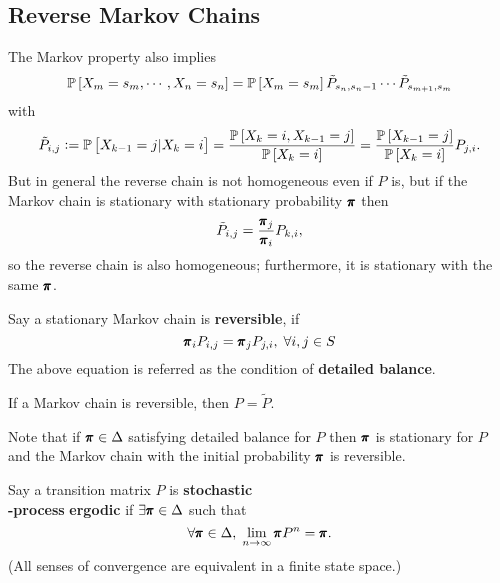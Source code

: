 \subsection{Reverse Markov Chains}

The Markov property also implies 
\begin{equation*}
    \mathbb{P} \left[ X_m = s_m, \cdots, X_n = s_n \right] = \mathbb{P} \left[ X_m = s_m \right] \tilde{P}_{s_n, s_n-1} \cdots \tilde{P}_{s_{m+1}, s_m}
\end{equation*}
with 
\begin{equation*}
    \tilde{P}_{i,j} := \mathbb{P} \left[ X_{k-1} = j| X_{k} = i \right] = \frac{\mathbb{P} \left[ X_k = i, X_{k-1} = j \right] }{\mathbb{P} \left[ X_{k} = i \right] } = \frac{\mathbb{P} \left[ X_{k-1} = j \right]}{\mathbb{P} \left[ X_k = i \right]} P_{j, i}.
\end{equation*}
But in general the reverse chain is not homogeneous even if $P$ is, but if the Markov chain is stationary with stationary probability $\pmb{\pi}$ then 
\begin{equation*}
    \tilde{P}_{i,j} = \frac{\pmb{\pi}_j}{\pmb{\pi}_i} P_{k,i},
\end{equation*} 
so the reverse chain is also homogeneous; furthermore, it is stationary with the same $\pmb{\pi}$.

\begin{definition}
    Say a stationary Markov chain is \textbf{reversible}, if
    \begin{equation*}
        \pmb{\pi}_i P_{i,j} = \pmb{\pi}_j P_{j,i}, \; \forall i,j \in S
    \end{equation*}
    The above equation is referred as the condition of \textbf{detailed balance}.
\end{definition}

\begin{remark}
    If a Markov chain is reversible, then $P = \tilde{P}$.
\end{remark}

\begin{proposition}
    Note that if $\pmb{\pi} \in \Delta$ satisfying detailed balance for $P$ then $\pmb{\pi}$ is stationary for $P$ and the Markov chain with the initial probability $\pmb{\pi}$ is reversible.
\end{proposition}

\begin{definition}
    Say a transition matrix $P$ is \textbf{stochastic}\\\textbf{-process} \textbf{ergodic} if $\exists \pmb{\pi} \in \Delta$ such that
    \begin{equation*}
        \forall \pmb{\pi} \in \Delta, \; \lim_{n\to\infty}\pmb{\pi} P^n= \pmb{\pi}.
    \end{equation*}
    (All senses of convergence are equivalent in a finite state space.)
\end{definition}

